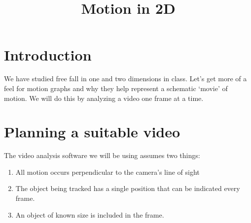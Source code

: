 \documentclass{handout}
\title{Motion in 2D}
\begin{document}
\maketitle

\section*{Introduction}
We have studied free fall in one and two dimensions in class. Let's get more of a feel for motion graphs and why they help represent a schematic `movie' of motion. We will do this by analyzing a video one frame at a time.


\section*{Planning a suitable video}
The video analysis software we will be using assumes two things:
\begin{enumerate}
    \item All motion occurs perpendicular to the camera's line of sight
    \item The object being tracked has a single position that can be indicated every frame.
    \item An object of known size is included in the frame.
\end{enumerate}
\end{document}
